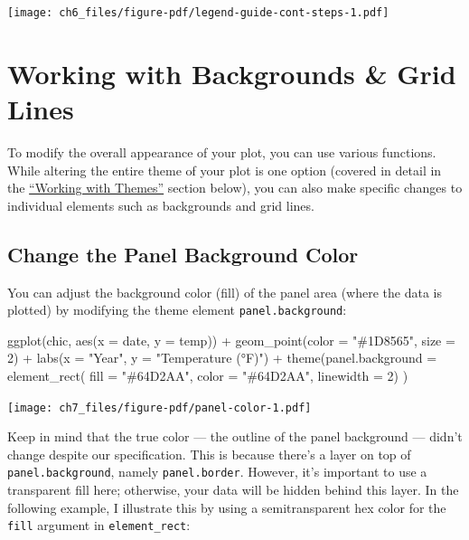 \documentclass[
  letterpaper,
  DIV=11,
  numbers=noendperiod]{scrreprt}
\newenvironment{Shaded}{\begin{snugshade}}{\end{snugshade}}
\newcommand{\AttributeTok}[1]{\textcolor[rgb]{0.40,0.45,0.13}{#1}}
\newcommand{\DecValTok}[1]{\textcolor[rgb]{0.68,0.00,0.00}{#1}}
\newcommand{\FunctionTok}[1]{\textcolor[rgb]{0.28,0.35,0.67}{#1}}
\newcommand{\NormalTok}[1]{\textcolor[rgb]{0.00,0.23,0.31}{#1}}
\newcommand{\SpecialCharTok}[1]{\textcolor[rgb]{0.37,0.37,0.37}{#1}}
\newcommand{\StringTok}[1]{\textcolor[rgb]{0.13,0.47,0.30}{#1}}
\begin{document}
\texttt{[image: ch6\_files/figure-pdf/legend-guide-cont-steps-1.pdf]}


\chapter{Working with Backgrounds \& Grid Lines}\label{style}

To modify the overall appearance of your plot, you can use various
functions. While altering the entire theme of your plot is one option
(covered in detail in the \hyperref[themes]{``Working with Themes''}
section below), you can also make specific changes to individual
elements such as backgrounds and grid lines.

\section{Change the Panel Background
Color}\label{change-the-panel-background-color}

You can adjust the background color (fill) of the panel area (where the
data is plotted) by modifying the theme element
\texttt{panel.background}:

\begin{Shaded}
\begin{Highlighting}[]
\FunctionTok{ggplot}\NormalTok{(chic, }\FunctionTok{aes}\NormalTok{(}\AttributeTok{x =}\NormalTok{ date, }\AttributeTok{y =}\NormalTok{ temp)) }\SpecialCharTok{+}
  \FunctionTok{geom\_point}\NormalTok{(}\AttributeTok{color =} \StringTok{"\#1D8565"}\NormalTok{, }\AttributeTok{size =} \DecValTok{2}\NormalTok{) }\SpecialCharTok{+}
  \FunctionTok{labs}\NormalTok{(}\AttributeTok{x =} \StringTok{"Year"}\NormalTok{, }\AttributeTok{y =} \StringTok{"Temperature (°F)"}\NormalTok{) }\SpecialCharTok{+}
  \FunctionTok{theme}\NormalTok{(}\AttributeTok{panel.background =} \FunctionTok{element\_rect}\NormalTok{(}
    \AttributeTok{fill =} \StringTok{"\#64D2AA"}\NormalTok{, }\AttributeTok{color =} \StringTok{"\#64D2AA"}\NormalTok{, }\AttributeTok{linewidth =} \DecValTok{2}\NormalTok{)}
\NormalTok{  )}
\end{Highlighting}
\end{Shaded}

\texttt{[image: ch7\_files/figure-pdf/panel-color-1.pdf]}

Keep in mind that the true color --- the outline of the panel background
--- didn't change despite our specification. This is because there's a
layer on top of \texttt{panel.background}, namely \texttt{panel.border}.
However, it's important to use a transparent fill here; otherwise, your
data will be hidden behind this layer. In the following example, I
illustrate this by using a semitransparent hex color for the
\texttt{fill} argument in \texttt{element\_rect}:
\end{document}
